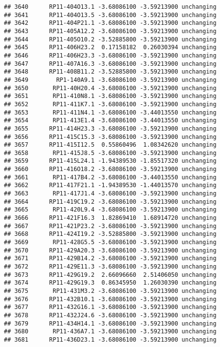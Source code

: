 \documentclass[]{article}
\begin{document}
\begin{verbatim}
## 3640      RP11-404O13.1 -3.68086100 -3.59213900 unchanging
## 3641      RP11-404O13.5 -3.68086100 -3.59213900 unchanging
## 3642      RP11-404P21.1 -3.68086100 -3.59213900 unchanging
## 3643      RP11-405A12.2 -3.68086100 -3.59213900 unchanging
## 3644      RP11-405O10.2 -3.52885800 -3.59213900 unchanging
## 3645      RP11-406H23.2  0.17158182  0.26030394 unchanging
## 3646      RP11-406H23.3 -3.68086100 -3.59213900 unchanging
## 3647      RP11-407A16.3 -3.68086100 -3.59213900 unchanging
## 3648      RP11-408B11.2 -3.52885800 -3.59213900 unchanging
## 3649        RP1-140A9.1 -3.68086100 -3.59213900 unchanging
## 3650       RP11-40H20.4 -3.68086100 -3.59213900 unchanging
## 3651       RP11-410N8.1 -3.68086100 -3.59213900 unchanging
## 3652       RP11-411K7.1 -3.68086100 -3.59213900 unchanging
## 3653       RP11-411N4.1 -3.68086100 -3.44013550 unchanging
## 3654       RP11-413E1.4 -3.68086100 -3.44013550 unchanging
## 3655      RP11-414H23.3 -3.68086100 -3.59213900 unchanging
## 3656      RP11-415C15.3 -3.68086100 -3.59213900 unchanging
## 3657      RP11-415I12.5  0.55860496  1.08342620 unchanging
## 3658       RP11-415J8.5 -3.68086100 -3.59213900 unchanging
## 3659      RP11-415L24.1 -1.94389530 -1.85517320 unchanging
## 3660      RP11-416O18.2 -3.68086100 -3.59213900 unchanging
## 3661       RP11-417B4.2 -3.68086100 -3.44013550 unchanging
## 3662      RP11-417F21.1 -1.94389530 -1.44013570 unchanging
## 3663       RP11-417J1.4 -3.68086100 -3.59213900 unchanging
## 3664      RP11-419C19.2 -3.68086100 -3.59213900 unchanging
## 3665       RP11-420L9.4 -3.68086100 -3.59213900 unchanging
## 3666      RP11-421F16.3  1.82869410  1.68914720 unchanging
## 3667      RP11-421P23.2 -3.68086100 -3.59213900 unchanging
## 3668      RP11-424I19.2 -3.52885800 -3.59213900 unchanging
## 3669       RP11-428G5.5 -3.68086100 -3.59213900 unchanging
## 3670      RP11-429A20.3 -3.68086100 -3.59213900 unchanging
## 3671      RP11-429B14.2 -3.68086100 -3.59213900 unchanging
## 3672      RP11-429E11.3 -3.68086100 -3.59213900 unchanging
## 3673      RP11-429G19.2  2.66096660  2.51406050 unchanging
## 3674      RP11-429G19.3  0.86345950  1.26030390 unchanging
## 3675       RP11-431M3.2 -3.68086100 -3.59213900 unchanging
## 3676      RP11-432B10.1 -3.68086100 -3.59213900 unchanging
## 3677      RP11-432G16.1 -3.68086100 -3.59213900 unchanging
## 3678      RP11-432J24.6 -3.68086100 -3.59213900 unchanging
## 3679      RP11-434H14.1 -3.68086100 -3.59213900 unchanging
## 3680       RP11-436A7.1 -3.68086100 -3.59213900 unchanging
## 3681      RP11-436D23.1 -3.68086100 -3.59213900 unchanging

\end{verbatim}
\end{document}
